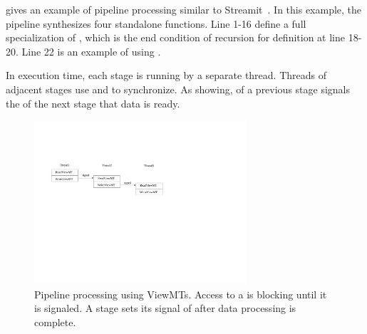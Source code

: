  gives an example of pipeline processing similar to Streamit~\cite{ThiesKA02}.
In this example, the pipeline synthesizes four standalone functions.
Line 1-16 define a full specialization of , which is the end
condition of recursion for definition  at line 18-20.
Line 22 is an example of using . 

In execution time, each stage is running by a separate thread. Threads of
adjacent stages use  and  to synchronize.
As  showing,  of a previous stage signals the
 of the next stage that data is ready.



\begin{figure}[tp]
  \includegraphics[width=3.1in]{../viewmt}
  \caption{Pipeline processing using ViewMTs. Access to a  is
  blocking until it is signaled. A stage sets its signal of 
after data processing is complete.}
  \label{fig:viewmt}
\end{figure}

